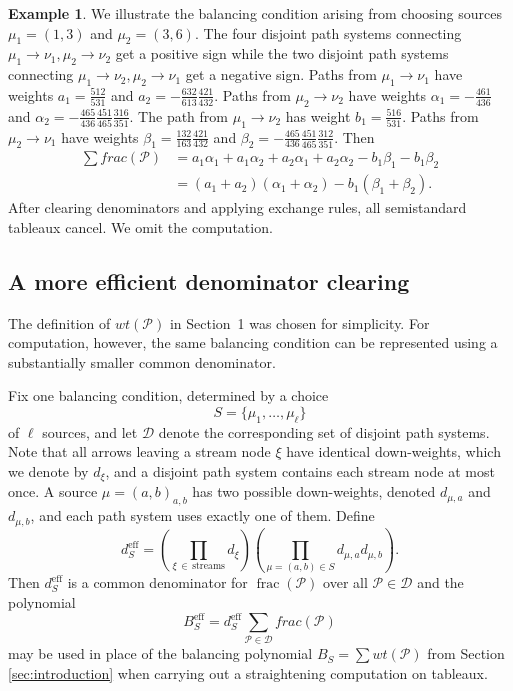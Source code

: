 \documentclass[11pt,letterpaper]{amsart}
\theoremstyle{definition}
\newtheorem{example}{Example}
\begin{document}
\begin{example}
We illustrate the balancing condition arising from choosing sources $\mu_1 = (1,3)$ and $\mu_2 = (3,6)$. The four disjoint path systems connecting $\mu_1 \to \nu_1, \mu_2 \to \nu_2$ get a positive sign while the two disjoint path systems connecting $\mu_1 \to \nu_2, \mu_2 \to \nu_1$ get a negative sign. Paths from $\mu_1 \to \nu_1$ have weights $a_1=\frac{512}{531}$ and $a_2 = -\frac{632}{613}\frac{421}{432}$. Paths from $\mu_2 \to \nu_2$ have weights $\alpha_1 = -\frac{461}{436}$ and $\alpha_2 = -\frac{465}{436}\frac{451}{465}\frac{316}{351}$. The path from $\mu_1 \to \nu_2$ has weight $b_1 = \frac{516}{531}$. Paths from $\mu_2 \to \nu_1$ have weights $\beta_1 = \frac{132}{163}\frac{421}{432}$ and $\beta_2 = -\frac{465}{436}\frac{451}{465}\frac{312}{351}$. Then
\begin{align*}
    \sum frac(\mathcal{P}) &= a_1 \alpha_1 + a_1 \alpha_2 + a_2 \alpha_1 + a_2 \alpha_2 - b_1 \beta_1 - b_1 \beta_2 \\
    &= (a_1 + a_2)(\alpha_1 + \alpha_2) - b_1(\beta_1 + \beta_2).
\end{align*}
After clearing denominators and applying exchange rules, all semistandard tableaux cancel. We omit the computation.

\end{example}


\subsection{A more efficient denominator clearing}\label{subsec:more-efficient-denominator-clearing}

The definition of $wt(\mathcal P)$ in Section~1 was chosen for simplicity. For computation, however, the same balancing condition can
be represented using a substantially smaller common denominator. 

Fix one balancing condition, determined by a choice
\begin{equation*}
    S=\{ \mu_1, \dots, \mu_\ell \}
\end{equation*}
of $\ell$ sources, and let $\mathcal{D}$ denote the corresponding set of disjoint path systems. Note that all arrows leaving a stream node $\xi$ have identical down-weights, which we denote by $d_\xi$, and a disjoint path system contains each stream node at most once.  A source $\mu=(a,b)_{a,b}$ has two possible down-weights, denoted $d_{\mu,a}$ and $d_{\mu,b}$, and each path system uses exactly one of them. Define
\begin{equation*}
    d_S^{\text{eff}} = \left(\prod_{\xi \, \in \, \text{streams}} d_\xi\right) \left( \prod_{\mu=(a,b)\in S} d_{\mu,a}d_{\mu,b} \right).
\end{equation*}
Then $d_S^{\text{eff}}$ is a common denominator for
$\operatorname{frac}(\mathcal P)$ over all
$\mathcal P\in \mathcal{D}$ and the polynomial
\begin{equation*}
    B_S^{\text{eff}} = d_S^{\text{eff}} \sum_{\mathcal{P} \in \mathcal{D}} frac(\mathcal{P})
\end{equation*}
may be used in place of the balancing polynomial $B_S = \sum wt(\mathcal{P})$ from Section \ref{sec:introduction} when carrying out a straightening computation on tableaux. 
\end{document}
